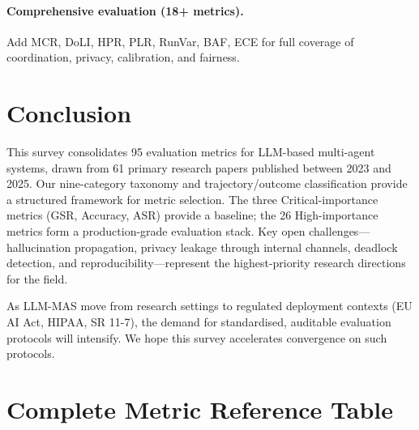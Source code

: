 \documentclass[11pt,a4paper]{article}
\begin{document}
\paragraph{Comprehensive evaluation (18+ metrics).}
Add MCR, DoLI, HPR, PLR, RunVar, BAF, ECE for full coverage of coordination,
privacy, calibration, and fairness.

\section{Conclusion}
\label{sec:conclusion}

This survey consolidates 95 evaluation metrics for LLM-based multi-agent systems,
drawn from 61 primary research papers published between 2023 and 2025. Our nine-category
taxonomy and trajectory/outcome classification provide a structured framework for metric
selection. The three Critical-importance metrics (GSR, Accuracy, ASR) provide a
baseline; the 26 High-importance metrics form a production-grade evaluation stack. Key
open challenges—hallucination propagation, privacy leakage through internal channels,
deadlock detection, and reproducibility—represent the highest-priority research
directions for the field.

As LLM-MAS move from research settings to regulated deployment contexts (EU AI Act,
HIPAA, SR 11-7), the demand for standardised, auditable evaluation protocols will
intensify. We hope this survey accelerates convergence on such protocols.




\appendix
\section{Complete Metric Reference Table}
\label{app:full_table}
\end{document}
